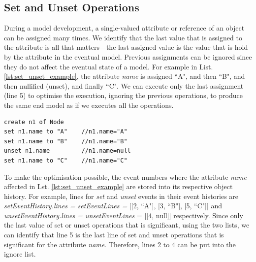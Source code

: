 \documentclass{llncs}
\begin{document}
\subsection{Set and Unset Operations}
\label{subsec:set_and_unset_operations}
During a model development, a single-valued attribute or reference of an object can be assigned many times. We identify that the last value that is assigned to the attribute is all that matters---the last assigned value is the value that is hold by the attribute in the eventual model. Previous assignments can be ignored since they do not affect the eventual state of a model. For example in List. \ref{lst:set_unset_example}, the attribute \emph{name} is assigned ``A", and then ``B", and then nullified (unset), and finally ``C". We can execute only the last assignment (line 5) to optimise the execution, ignoring the previous operations, to produce the same end model as if we executes all the operations. 

\begin{lstlisting}[style=eol,caption={Example of CBP representation of \emph{name} attribute assignments.},label=lst:set_unset_example]
create n1 of Node
set n1.name to "A"    //n1.name="A"    
set n1.name to "B"    //n1.name="B"
unset n1.name         //n1.name=null
set n1.name to "C"    //n1.name="C"
\end{lstlisting}

To make the optimisation possible, the event numbers where the attribute \emph{name} affected in Lst. \ref{lst:set_unset_example} are stored into its respective object history.  For example, lines for \emph{set} and \emph{unset} events in their event histories are \emph{setEventHistory.lines = setEventLines =} [[2, ``A"], [3, ``B"], [5, ``C"]] and \emph{unsetEventHistory.lines = unsetEventLines} = [[4, null]] respectively. Since only the last value of set or unset operations that is significant, using the two lists, we can identify that line 5 is the last line of set and unset operations that is significant for the attribute \emph{name}. Therefore, lines 2 to 4 can be put into the ignore list.  
\end{document}
